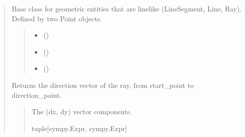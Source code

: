 \documentclass[letterpaper,10pt,english]{sphinxmanual}
\begin{document}
\begin{quote}
\begin{fulllineitems}
\sphinxAtStartPar
Base class for geometric entities that are line\sphinxhyphen{}like (LineSegment, Line, Ray).
Defined by two Point objects.
\begin{quote}\begin{description}
\begin{itemize}
\item {} 
\sphinxAtStartPar
{} ()

\item {} 
\sphinxAtStartPar
{} ()

\item {} 
\sphinxAtStartPar
{} (\sphinxstyleliteralemphasis{\sphinxupquote{ | }})

\end{itemize}

\end{description}\end{quote}

\begin{fulllineitems}
\label{\detokenize{pygeox:pygeox.basic_objects.LineLike.direction_vector}}
\pysigstartsignatures
\pysigline
{}
\pysigstopsignatures
\sphinxAtStartPar
Returns the direction vector of the ray, from start\_point to direction\_point.
\begin{quote}\begin{description}
\sphinxAtStartPar
The (dx, dy) vector components.

\sphinxAtStartPar
tuple{[}sympy.Expr, sympy.Expr{]}

\end{description}\end{quote}


\end{fulllineitems}
\end{fulllineitems}
\end{quote}
\end{document}
